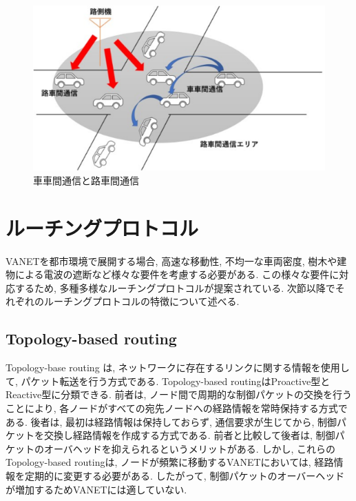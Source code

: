 \documentclass[10pt]{jreport}
\begin{document}
\begin{figure}[!ht]
\centering
\includegraphics[width=15cm]{figures/VANET.eps}
\caption{車車間通信と路車間通信}
\label{fig:VANET}
\end{figure}


\section{ルーチングプロトコル}
\label{RoutingProtocol}
VANETを都市環境で展開する場合, 高速な移動性, 不均一な車両密度, 樹木や建物による電波の遮断など様々な要件を考慮する必要がある. この様々な要件に対応するため, 多種多様なルーチングプロトコルが提案されている\cite{2}. 次節以降でそれぞれのルーチングプロトコルの特徴について述べる.

\subsection{Topology-based routing}
\label{Topology}
Topology-base routing\cite {3,4,5} は, ネットワークに存在するリンクに関する情報を使用して, パケット転送を行う方式である. Topology-based routingはProactive型とReactive型に分類できる. 前者は, ノード間で周期的な制御パケットの交換を行うことにより, 各ノードがすべての宛先ノードへの経路情報を常時保持する方式である. 後者は, 最初は経路情報は保持しておらず, 通信要求が生じてから, 制御パケットを交換し経路情報を作成する方式である. 前者と比較して後者は, 制御パケットのオーバヘッドを抑えられるというメリットがある. 
しかし, これらのTopology-based routingは, ノードが頻繁に移動するVANETにおいては, 経路情報を定期的に変更する必要がある.
したがって, 制御パケットのオーバーヘッドが増加するためVANETには適していない.
\end{document}
